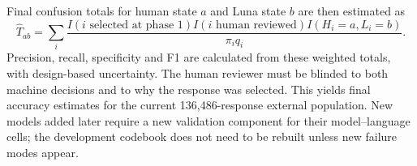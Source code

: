 Final confusion totals for human state \(a\) and Luna state \(b\) are then
estimated as
\[
\widehat T_{ab}=\sum_i
\frac{I(i\text{ selected at phase 1})I(i\text{ human reviewed})
I(H_i=a,L_i=b)}{\pi_iq_i}.
\]
Precision, recall, specificity and F1 are calculated from these weighted
totals, with design-based uncertainty. The human reviewer must be blinded to
both machine decisions and to why the response was selected. This yields final
accuracy estimates for the current 136,486-response external population. New
models added later require a new validation component for their model--language
cells; the development codebook does not need to be rebuilt unless new failure
modes appear.

